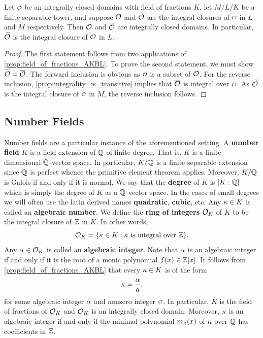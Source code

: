     \begin{proposition}\label{prop:integral_closure_is_transitive}
      Let \(\smc{O}\) be an integrally closed domains with field of fractions \(K\), let \(M/L/K\) be a finite separable tower, and suppose \(\mathcal{O}\) and \(\widetilde{\mathcal{O}}\) are the integral closures of \(\smc{O}\) in \(L\) and \(M\) respectively. Then \(\mathcal{O}\) and \(\widetilde{\mathcal{O}}\) are integrally closed domains. In particular, \(\widetilde{\mathcal{O}}\) is the integral closure of \(\mathcal{O}\) in \(L\).
    \end{proposition}
    \begin{proof}
      The first statement follows from two applications of \cref{prop:field_of_fractions_AKBL}. To prove the second statement, we must show \(\widetilde{\mathcal{O}} = \overline{\mathcal{O}}\). The forward inclusion is obvious as \(\smc{O}\) is a subset of \(\mathcal{O}\). For the reverse inclusion, \cref{prop:integrality_is_transitive} implies that \(\overline{\mathcal{O}}\) is integral over \(\smc{O}\). As \(\widetilde{\mathcal{O}}\) is the integral closure of \(\smc{O}\) in \(M\), the reverse inclusion follows.
    \end{proof}

    \subsection*{Number Fields}
      Number fields are a particular instance of the aforementioned setting. A \textbf{number field} \(K\) is a field extension of \(\mathbb{Q}\) of finite degree. That is, \(K\) is a finite dimensional \(\mathbb{Q}\)-vector space. In particular, \(K/\mathbb{Q}\) is a finite separable extension since \(\mathbb{Q}\) is perfect whence the primitive element theorem applies. Moreover, \(K/\mathbb{Q}\) is Galois if and only if it is normal. We say that the \textbf{degree} of \(K\) is \([K:\mathbb{Q}]\) which is simply the degree of \(K\) as a \(\mathbb{Q}\)-vector space. In the cases of small degrees we will often use the latin derived names \textbf{quadratic}, \textbf{cubic}, etc. Any \(\kappa \in K\) is called an \textbf{algebraic number}. We define the \textbf{ring of integers} \(\mathcal{O}_{K}\) of \(K\) to be the integral closure of \(\mathbb{Z}\) in \(K\). In other words,
      \[
        \mathcal{O}_{K} = \{\kappa \in K:\kappa \text{ is integral over } \mathbb{Z}\}.
      \]
      Any \(\alpha \in \mathcal{O}_{K}\) is called an \textbf{algebraic integer}. Note that \(\alpha\) is an algebraic integer if and only if it is the root of a monic polynomial \(f(x) \in \mathbb{Z}[x]\). It follows from \cref{prop:field_of_fractions_AKBL} that every \(\kappa \in K\) is of the form
      \[
        \kappa = \frac{\alpha}{a},
      \]
      for some algebraic integer \(\alpha\) and nonzero integer \(\smc{O}\). In particular, \(K\) is the field of fractions of \(\mathcal{O}_{K}\) and \(\mathcal{O}_{K}\) is an integrally closed domain. Moreover, \(\kappa\) is an algebraic integer if and only if the minimal polynomial \(m_{\kappa}(x)\) of \(\kappa\) over \(\mathbb{Q}\) has coefficients in \(\mathbb{Z}\).


